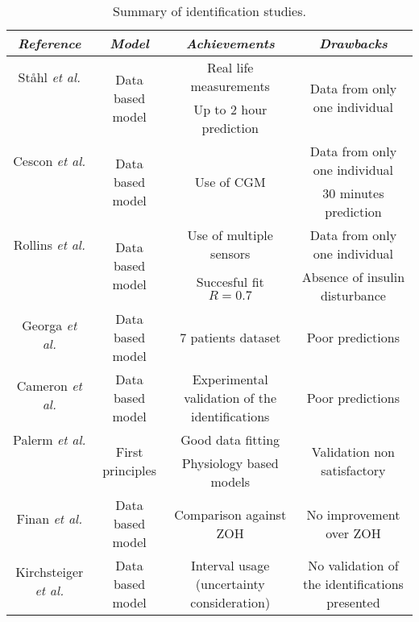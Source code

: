 \begin{sidewaystable}[hbtp]
	\centering
		\begin{tabular}{c|c|c|c}
		\emph{Reference} &	\emph{Model} & \emph{Achievements} & \emph{Drawbacks} \\
		\hline 
		\hline
		St{\aa}hl \textit{et al.} & \multirow{2}{*}{Data based model} & Real life measurements & \multirow{2}{*}{Data from only one individual} \\
		\cite{stahl2009diabetes} & & Up to 2 hour prediction & \\
		\hline 
		Cescon \textit{et al.} & \multirow{2}{*}{Data based model} & \multirow{2}{*}{Use of CGM} &Data from only one individual\\
		\cite{cescon2009subspace} & & & 30 minutes prediction \\
		\hline 
		Rollins \textit{et al.} & \multirow{2}{*}{Data based model} & Use of multiple sensors & Data from only one individual \\
		\cite{rollins2010free} & & Succesful fit $R=0.7$ & Absence of insulin disturbance \\
		\hline 
		Georga \textit{et al.}  & \multirow{2}{*}{Data based model} & \multirow{2}{*}{7 patients dataset} & \multirow{2}{*}{Poor predictions} \\
		\cite{georga2011glucose} & & & \\
		\hline 
		Cameron \textit{et al.}  & \multirow{2}{*}{Data based model} & \multirow{2}{*}{Experimental validation of the identifications} & \multirow{2}{*}{Poor predictions} \\
		\cite{cameron2012extended} & & & \\
		\hline 
		Palerm \textit{et al.} & \multirow{2}{*}{First principles} & Good data fitting & \multirow{2}{*}{Validation non satisfactory} \\
		\cite{palerm2006robust} & & Physiology based models &  \\
		\hline 
		Finan \textit{et al.} & \multirow{2}{*}{Data based model} & \multirow{2}{*}{Comparison against ZOH} & \multirow{2}{*}{No improvement over ZOH} \\
		\cite{finan2009experimental} & & & \\
	  \hline 
		Kirchsteiger \textit{et al.}  & \multirow{2}{*}{Data based model} & \multirow{2}{*}{Interval usage (uncertainty consideration)} & \multirow{2}{*}{No validation of the identifications presented} \\
		\cite{kirchsteiger2011estimating} & & & \\
	\end{tabular}
	\caption{Summary of identification studies.}
	\label{tab:iden_summary}
\end{sidewaystable}

